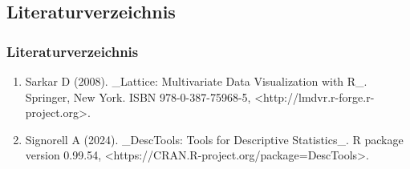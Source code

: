 \documentclass{beamer}
\begin{document}
\begin{frame}
	\section{Literaturverzeichnis}
	\frametitle{Literaturverzeichnis}
	\begin{enumerate}[]
		\item Sarkar D (2008). \_Lattice: Multivariate Data Visualization with R\_.
		Springer, New York. ISBN 978-0-387-75968-5,
		<http://lmdvr.r-forge.r-project.org>.
		\item Signorell A (2024). \_DescTools: Tools for Descriptive Statistics\_. R package
		version 0.99.54, <https://CRAN.R-project.org/package=DescTools>.
	\end{enumerate}
	
\end{frame}
\end{document}
